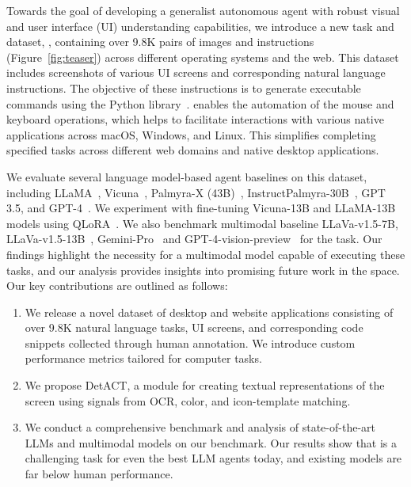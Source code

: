Towards the goal of developing a generalist autonomous agent with robust visual and user interface (UI) understanding capabilities, we introduce a new task and dataset, \ModelName{}, containing over 9.8K pairs of images and instructions (Figure~\ref{fig:teaser}) across different operating systems and the web. This dataset includes screenshots of various UI screens and corresponding natural language instructions. The objective of these instructions is to generate executable commands using the \textit{\pyautogui} Python library~\cite{PyAutoGUI}. \textit{\pyautogui} enables the automation of the mouse and keyboard operations, which helps to facilitate interactions with various native applications across macOS, Windows, and Linux. This simplifies completing specified tasks across different web domains and native desktop applications.

We evaluate several language model-based agent baselines on this dataset, including LLaMA~\cite{touvron2023llama}, Vicuna~\cite{vicuna2023}, Palmyra-X (43B)~\cite{palmyra-x}, InstructPalmyra-30B~\cite{InstructPalmyra}, GPT 3.5, and GPT-4~\cite{openai2023gpt4}. We experiment with fine-tuning Vicuna-13B and LLaMA-13B models using QLoRA~\cite{dettmers2023qlora}. We also benchmark multimodal baseline LLaVa-v1.5-7B, LLaVa-v1.5-13B~\cite{touvron2023llama}, Gemini-Pro~\cite{team2023gemini} and GPT-4-vision-preview~\cite{yang2023dawn} for the task. Our findings highlight the necessity for a multimodal model capable of executing these tasks, and our analysis provides insights into promising future work in the space. 
Our key contributions are outlined as follows:
\begin{enumerate}
    \item We release a novel dataset of desktop and website applications consisting of over 9.8K natural language tasks, UI screens, and corresponding code snippets collected through human annotation. We introduce custom performance metrics tailored for computer tasks.
    \item We propose DetACT, a module for creating textual representations of the screen using signals from OCR, color, and icon-template matching.
    \item We conduct a comprehensive benchmark and analysis of state-of-the-art LLMs and multimodal models on our benchmark. Our results show that \ModelName{} is a challenging task for even the best LLM agents today, and existing models are far below human performance.
\end{enumerate}

